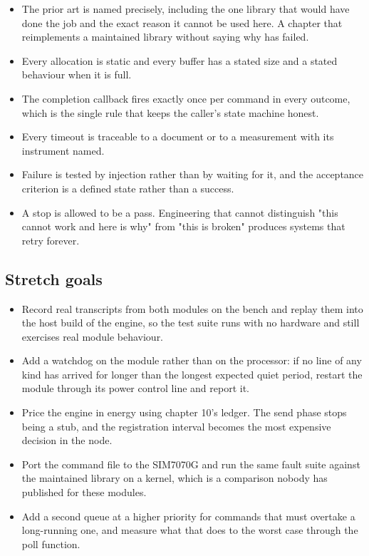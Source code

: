 \begin{itemize}
\item The prior art is named precisely, including the one library that would
have done the job and the exact reason it cannot be used here. A chapter that
reimplements a maintained library without saying why has failed.
\item Every allocation is static and every buffer has a stated size and a stated
behaviour when it is full.
\item The completion callback fires exactly once per command in every outcome,
which is the single rule that keeps the caller's state machine honest.
\item Every timeout is traceable to a document or to a measurement with its
instrument named.
\item Failure is tested by injection rather than by waiting for it, and the
acceptance criterion is a defined state rather than a success.
\item A stop is allowed to be a pass. Engineering that cannot distinguish "this
cannot work and here is why" from "this is broken" produces systems that retry
forever.
\end{itemize}

\subsection*{Stretch goals}

\begin{itemize}
\item Record real transcripts from both modules on the bench and replay them
into the host build of the engine, so the test suite runs with no hardware and
still exercises real module behaviour.
\item Add a watchdog on the module rather than on the processor: if no line of
any kind has arrived for longer than the longest expected quiet period, restart
the module through its power control line and report it.
\item Price the engine in energy using chapter 10's ledger. The send phase stops
being a stub, and the registration interval becomes the most expensive decision
in the node.
\item Port the command file to the SIM7070G and run the same fault suite against
the maintained library on a kernel, which is a comparison nobody has published
for these modules.
\item Add a second queue at a higher priority for commands that must overtake a
long-running one, and measure what that does to the worst case through the poll
function.
\end{itemize}

